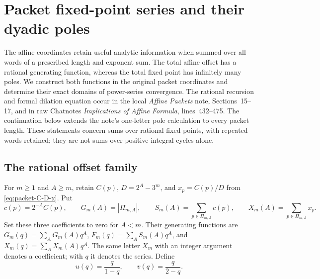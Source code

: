 \section{Packet fixed-point series and their dyadic poles}
\label{sec:packet-fixed-point-series}

The affine coordinates retain useful analytic information when summed over
all words of a prescribed length and exponent sum.  The total affine offset
has a rational generating function, whereas the total fixed point has
infinitely many poles.  We construct both functions in the original packet
coordinates and determine their exact domains of power-series convergence.
The rational recursion and formal dilation equation occur in the local
\emph{Affine Packets} note, Sections~15--17, and in raw Chatnotes
\emph{Implications of Affine Formula}, lines~432--475.  The continuation
below extends the note's one-letter pole calculation to every packet length.
These statements concern sums over rational fixed points, with repeated
words retained; they are not sums over positive integral cycles alone.

\subsection{The rational offset family}

For $m\ge1$ and $A\ge m$, retain $C(p)$, $D=2^A-3^m$, and
$x_p=C(p)/D$ from \eqref{eq:packet-C-D-x}.  Put
\[
 c(p)=2^{-A}C(p),\qquad
 G_m(A)=|\Pi_{m,A}|,\qquad
 S_m(A)=\sum_{p\in\Pi_{m,A}}c(p),\qquad
 X_m(A)=\sum_{p\in\Pi_{m,A}}x_p.
\]
Set these three coefficients to zero for $A<m$.  Their generating
functions are $G_m(q)=\sum_A G_m(A)q^A$, $F_m(q)=\sum_A S_m(A)q^A$,
and $X_m(q)=\sum_A X_m(A)q^A$.  The same letter $X_m$ with an integer
argument denotes a coefficient; with $q$ it denotes the series.  Define
\[
 u(q)=\frac q{1-q},\qquad v(q)=\frac q{2-q}.
\]

